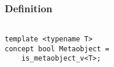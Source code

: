 
\subsubsection{Definition}

\begin{verbatim}

template <typename T>
concept bool Metaobject =
	is_metaobject_v<T>;

\end{verbatim}
